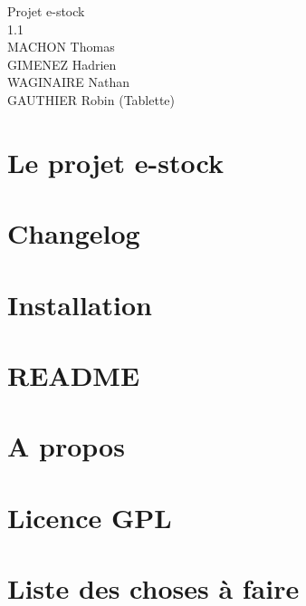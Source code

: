 \documentclass[twoside]{article}
\newcommand{\+}{\discretionary{\mbox{\scriptsize$\hookleftarrow$}}{}{}}
\begin{document}
\hypersetup{pageanchor=false,
             bookmarksnumbered=true,
             pdfencoding=unicode
            }
\begin{titlepage}
\vspace*{7cm}
\begin{center}%
{\LARGE Projet e-\/stock \\[1ex]\large 1.\+1 }\\
\vspace*{1cm}
{\large MACHON Thomas}\\
{\large GIMENEZ Hadrien}\\
{\large WAGINAIRE Nathan}\\
{\large GAUTHIER Robin (Tablette)}\\
\end{center}
\end{titlepage}
\tableofcontents
{}
\hypersetup{pageanchor=true}

\section{Le projet e-\/stock}
\label{index}\hypertarget{index}{}
\section{Changelog}
\label{page_changelog}

\section{Installation}
\label{page_install}

\section{R\+E\+A\+D\+ME}
\label{page__r_e_a_d_m_e}

\section{A propos}
\label{page_about}

\section{Licence G\+PL}
\label{page_licence}

\section{Liste des choses à faire}
\label{todo}

\end{document}
